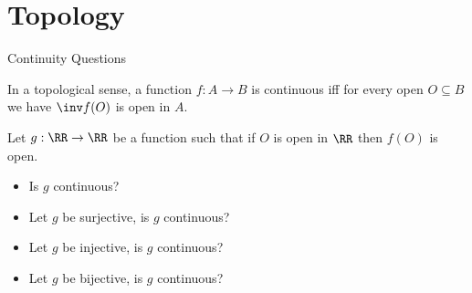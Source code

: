 \section{Topology}
\begin{boxProblem}{Continuity Questions}
    \begin{boxDefinition}{}
        In a topological sense,
        a function \( f : A \to B \) is continuous iff for every open \( O \subseteq B \) we have \( \inv f(O) \) is open in \( A \).
    \end{boxDefinition}
    Let \( g : \RR \to \RR \) be a function such that if \( O \) is open in \( \RR \) then \( f(O) \) is open.
    \begin{itemize}
        \item Is \( g \) continuous?
        \item Let \( g \) be surjective, is \( g \) continuous?
        \item Let \( g \) be injective, is \( g \) continuous?
        \item Let \( g \) be bijective, is \( g \) continuous?
    \end{itemize}
\end{boxProblem}
